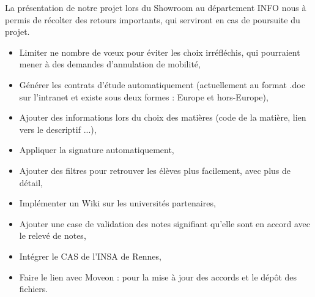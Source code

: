 La présentation de notre projet lors du Showroom au département INFO nous à permis de récolter des retours importants, qui serviront en cas de poursuite du projet.
\bigbreak
\begin{itemize}
	\item Limiter ne nombre de vœux pour éviter les choix irréfléchis, qui pourraient mener à des demandes d'annulation de mobilité,
	\item Générer les contrats d'étude automatiquement (actuellement au format .doc sur l'intranet et existe sous deux formes : Europe et hors-Europe),
	\item Ajouter des informations lors du choix des matières (code de la matière, lien vers le descriptif ...),
	\item Appliquer la signature automatiquement,
	\item Ajouter des filtres pour retrouver les élèves plus facilement, avec plus de détail,
	\item Implémenter un Wiki sur les universités partenaires,
	\item Ajouter une case de validation des notes signifiant qu'elle sont en accord avec le relevé de notes,
	\item Intégrer le CAS de l'INSA de Rennes,
	\item Faire le lien avec Moveon : pour la mise à jour des accords et le dépôt des fichiers.
\end{itemize}